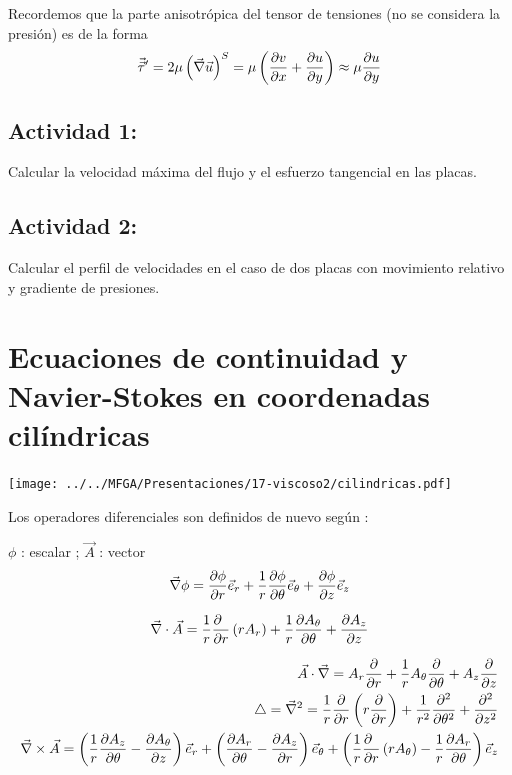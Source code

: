 Recordemos que la parte anisotrópica del tensor de tensiones (no se
considera la presión) es de la forma
\[
\vec{\vec{\tau}}^{\prime}=2\mu\left(\vec{\nabla}\text{\ensuremath{\vec{u}}}\right)^{S}=\mu\left(\frac{\partial v}{\partial x}+\frac{\partial u}{\partial y}\right)\approx\mu\frac{\partial u}{\partial y}
\]

\subsection*{Actividad 1:}
Calcular la velocidad máxima del flujo y el esfuerzo tangencial en las placas.


\subsection*{Actividad 2:}
Calcular el perfil de velocidades en el caso de dos placas con movimiento
relativo y gradiente de presiones.
	
\section{Ecuaciones de continuidad y Navier-Stokes en coordenadas cilíndricas}

\begin{center}
	\texttt{[image: ../../MFGA/Presentaciones/17-viscoso2/cilindricas.pdf]}
\end{center}

	
	Los operadores diferenciales son definidos de nuevo según :
	
	$\phi$ : escalar ; $\vec{A}$ : vector 
		\[
		\vec{\nabla}\phi=\frac{\partial \phi}{\partial r}\vec{e}_{r}+\frac{1}{r}\frac{\partial \phi}{\partial \theta}\vec{e}_{\theta}+\frac{\partial \phi}{\partial z}\vec{e}_{z}
		\]
		
		\[
		\vec{\nabla}\cdot\vec{A}=\frac{1}{r}\frac{\partial \phantom{r}}{\partial r}\left(rA_{r}\right)+\frac{1}{r}\frac{\partial A_{\theta}}{\partial \theta}+\frac{\partial A_{z}}{\partial z}
		\]
	
		\[
		\begin{aligned}\vec{A}\cdot\vec{\nabla}=A_{r}\frac{\partial }{\partial r}+\frac{1}{r}A_{\theta}\frac{\partial }{\partial \theta}+A_{z}\frac{\partial }{\partial z}\\
			\triangle=\vec{\nabla}^{2}=\frac{1}{r}\frac{\partial }{\partial r}\left(r\frac{\partial }{\partial r}\right)+\frac{1}{r^{2}}\frac{\partial^2 }{\partial \theta^2}+\frac{\partial^2 }{\partial z^2}\\
			\begin{split}\vec{\nabla}\times\vec{A}=\left(\frac{1}{r}\frac{\partial A_{z}}{\partial \theta}-\frac{\partial A_{\theta}}{\partial z}\right)\vec{e}_{r}+\left(\frac{\partial A_{r}}{\partial \theta}-\frac{\partial A_{z}}{\partial r}\right)\vec{e}_{\theta}+\left(\frac{1}{r}\frac{\partial \phantom{r}}{\partial r}\left(rA_{\theta}\right)-\frac{1}{r}\frac{\partial A_{r}}{\partial \theta}\right)\vec{e}_{z}\end{split}
		\end{aligned}
		\]
	
